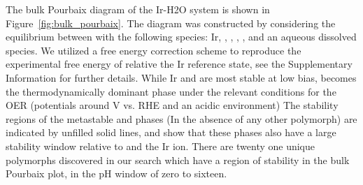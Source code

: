 %
%
The bulk Pourbaix diagram of the Ir-H2O system is shown in Figure~\ref{fig:bulk_pourbaix}.
%
The diagram was constructed by considering the equilibrium between with the following species: Ir, \rIrOtwo, \aIrOthree,  \rIrOthree, \bIrOthree, and an aqueous dissolved  species.
%
We utilized a free energy correction scheme to reproduce the experimental free energy of \IrOtwo relative the Ir reference state, see the Supplementary Information for further details.
%
While Ir and \rIrOtwo are most stable at low bias, \aIrOthree becomes the thermodynamically dominant phase under the relevant conditions for the OER (potentials around  V vs. RHE and an acidic environment)
%
The stability regions of the metastable \rIrOthree and \bIrOthree phases (In the absence of any other \IrOthree polymorph) are indicated by unfilled solid lines, and show that these phases also have a large stability window relative to \IrOtwo and the Ir ion.
%
There are twenty one unique \IrOthree polymorphs discovered in our search which have a region of stability in the bulk Pourbaix plot, in the pH window of zero to sixteen.
%


